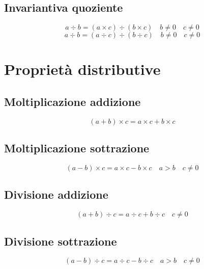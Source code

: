 \subsection{Invariantiva quoziente}
\begin{equation}
a\div b=(a\times c)\div (b\times c)\quad b\neq 0\quad c \neq 0
\end{equation}
\begin{equation}
a\div b=(a\div c)\div (b\div c)\quad b\neq 0\quad c \neq 0
\end{equation}
\section{Proprietà distributive}
\subsection{Moltiplicazione addizione}
\begin{equation}
(a+b)\times c=a\times c+b\times c
\end{equation}
\subsection{Moltiplicazione sottrazione}
\begin{equation}
(a-b)\times c=a\times c-b\times c\quad a>b\quad c\neq 0
\end{equation}
\subsection{Divisione addizione}
\begin{equation}
(a+b)\div c=a\div c+b\div c\quad c\neq 0
\end{equation}
\subsection{Divisione sottrazione}
\begin{equation}
(a-b)\div c=a\div c-b\div c\quad a>b\quad c\neq 0
\end{equation}

